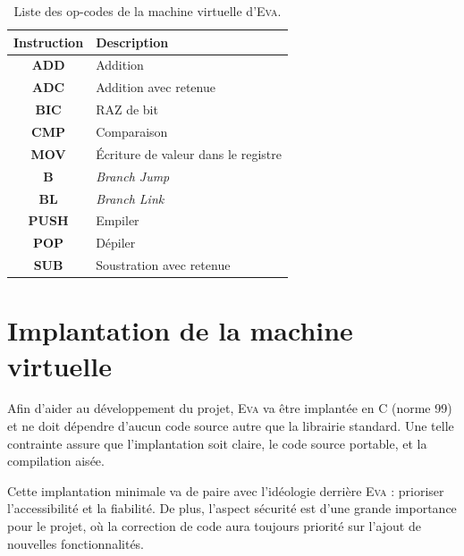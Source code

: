 \documentclass[11pt,twoside]{article}
\newcommand{\noun}[1]{\textsc{#1}}
\begin{document}
\begin{table}[tb]
  \begin{centering}
    \begin{tabular}{|c|l|}
      \hline
      \textbf{Instruction} & \textbf{Description}                \\
      \hline
      \hline
      \textbf{ADD}         & Addition                            \\
      \hline
      \textbf{ADC}         & Addition avec retenue               \\
      \hline
      \textbf{BIC}         & RAZ de bit                          \\
      \hline
      \textbf{CMP}         & Comparaison                         \\
      \hline
      \textbf{MOV}         & Écriture de valeur dans le registre \\
      \hline
      \textbf{B}           & \emph{Branch Jump}                  \\
      \hline
      \textbf{BL}          & \emph{Branch Link}                  \\
      \hline
      \textbf{PUSH}        & Empiler                             \\
      \hline
      \textbf{POP}         & Dépiler                             \\
      \hline
      \textbf{SUB}         & Soustration avec retenue            \\
      \hline
    \end{tabular}
    \par\end{centering}
  \caption{Liste des op-codes de la machine virtuelle d'\noun{Eva}.}
  \label{tab:opcodes}
\end{table}


\section{Implantation de la machine virtuelle}

Afin d'aider au développement du projet, \noun{Eva} va être implantée
en C (norme 99) et ne doit dépendre d'aucun code source autre que
la librairie standard. Une telle contrainte assure que l'implantation
soit claire, le code source portable, et la compilation aisée.

Cette implantation minimale va de paire avec l'idéologie derrière
\noun{Eva} : prioriser l'accessibilité et la fiabilité. De plus, l'aspect
sécurité est d'une grande importance pour le projet, où la correction
de code aura toujours priorité sur l'ajout de nouvelles fonctionnalités.
\end{document}
